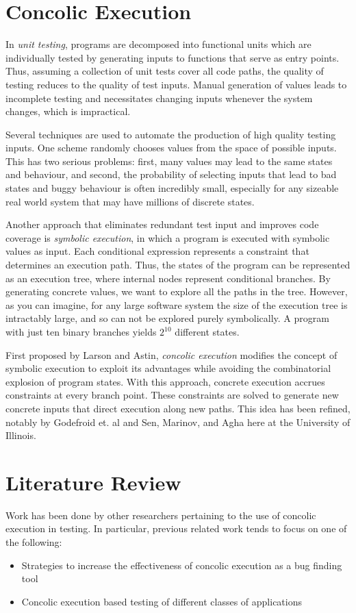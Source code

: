 \documentclass[11pt]{article}
\begin{document}
\section{Concolic Execution}
In \textit{unit testing}, programs are decomposed into functional units which
are individually tested by generating inputs to functions that serve as entry
points. Thus, assuming a collection of unit tests cover all code paths, the
quality of testing reduces to the quality of test inputs. Manual generation of
values leads to incomplete testing and necessitates changing inputs whenever the
system changes, which is impractical. \par
Several techniques are used to automate
the production of high quality testing inputs. One scheme randomly chooses
values from the space of possible inputs. This has two serious problems: first,
many values may lead to the same states and behaviour, and second, the
probability of selecting inputs that lead to bad states and buggy behaviour is
often incredibly small, especially for any sizeable real world system that may
have millions of discrete states. \par
Another approach that eliminates redundant
test input and improves code coverage is \textit{symbolic execution}, in which a
program is executed with symbolic values as input. Each conditional expression
represents a constraint that determines an execution path. Thus, the states of
the program can be represented as an execution tree, where internal nodes
represent conditional branches. By generating concrete values, we want to
explore all the paths in the tree. However, as you can imagine, for any large
software system the size of the execution tree is intractably large, and so can
not be explored purely symbolically. A program with just ten binary branches
yields $2^{10}$ different states. \par
First proposed by Larson and Astin, \textit{concolic execution} modifies the concept of symbolic execution to
exploit its advantages while avoiding the combinatorial explosion of program
states. With this approach, concrete execution accrues constraints at every
branch point. These constraints are solved to generate new concrete inputs that
direct execution along new paths. This idea has been refined, notably by
Godefroid et. al \cite{Godefroid} and Sen, Marinov, and
Agha \cite{Sen} here at the University of Illinois. 

\section{Literature Review}
Work has been done by other researchers pertaining to the use of concolic
execution in testing. In particular, previous related work
tends to focus on one of the following:
\begin{itemize}
\item Strategies to increase the effectiveness of concolic execution as a bug
finding tool
\item Concolic execution based testing of different classes of applications
\end{itemize}
\end{document}
